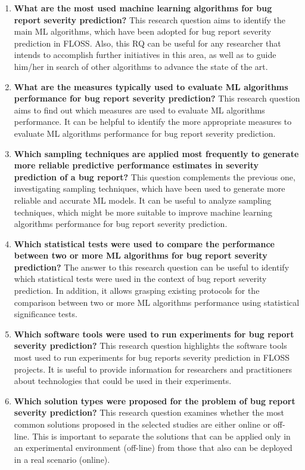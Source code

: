 \begin{enumerate}[label=\textbf{ RQ$_{\arabic*}$}., leftmargin=1.2cm]
  \item \textbf{What are the most used machine learning algorithms for bug report severity prediction?} This research question aims to identify the main ML algorithms, which have been adopted for bug report severity prediction in FLOSS. Also, this RQ can be useful for any researcher that intends to accomplish further initiatives in this area, as well as to guide him/her in search of other algorithms to advance the state of the art.
  
  \item \textbf{What are the measures typically used to evaluate ML algorithms performance for bug report severity prediction?} This research question aims to find out which measures are used to evaluate ML algorithms performance. It can be helpful to identify the more appropriate measures to evaluate ML algorithms performance for bug report severity prediction. 
  
  \item \textbf{Which sampling techniques are applied most frequently to generate more reliable predictive performance estimates in severity prediction of a bug report?} This question complements the previous one, investigating sampling techniques, which have been used to generate more reliable and accurate ML models. It can be useful to analyze sampling techniques, which might be more suitable to improve machine learning algorithms performance for bug report severity prediction.
  
  \item \textbf{Which statistical tests were used to compare the performance between two or more ML algorithms for bug report severity prediction?} The answer to this research question can be useful to identify which statistical tests were used in the context of bug report severity prediction. In addition, it allows grasping existing protocols for the comparison between two or more ML algorithms performance using statistical significance tests.
  
  \item \textbf{Which software tools were used to run experiments for bug report severity prediction?} This research question highlights the software tools most used to run experiments for bug reports severity prediction in FLOSS projects. It is useful to provide information for researchers and practitioners about technologies that could be used in their experiments.
  
  \item \textbf{Which solution types were proposed for the problem of bug report severity prediction?} This research question examines whether the most common solutions proposed in the selected studies are either online or off-line. This is important to separate the solutions that can be applied only in an experimental environment (off-line) from those that also can be deployed in a real scenario (online).
\end{enumerate}

